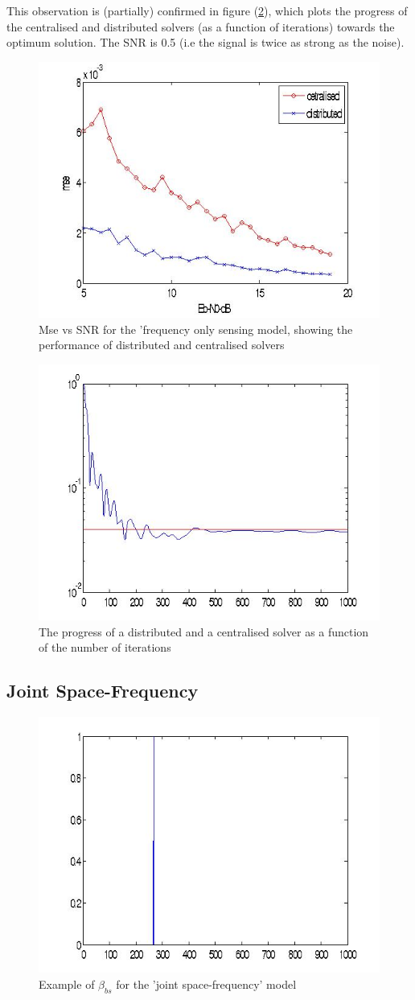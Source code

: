 \documentclass{article}
\begin{document}
This observation is (partially) confirmed in figure (\ref{erroriterations}), which plots the progress of the centralised and distributed solvers (as a function of iterations) towards the optimum solution. The SNR is 0.5 (i.e the signal is twice as strong as the noise).

\begin{figure}[h]
\centering
\includegraphics[height = 5 cm]{centvsdistmsegaussian10perpoint.jpg}
\caption{Mse vs SNR for the 'frequency only sensing model, showing the performance of distributed and centralised solvers}
\label{msevssnr1}
\end{figure}

\begin{figure}[ht]
\centering
\includegraphics[height = 5 cm]{erroriterations1.jpg}
\caption{The progress of a distributed and a centralised solver as a function of the number of iterations }
\label{erroriterations}
\end{figure}

\subsection{Joint Space-Frequency}

\begin{figure}[htb]
\centering
\includegraphics[height = 5 cm]{betabs.jpg}
\caption{Example of \(\beta_{bs}\) for the 'joint space-frequency' model}
\label{beta}
\end{figure}
\end{document}
